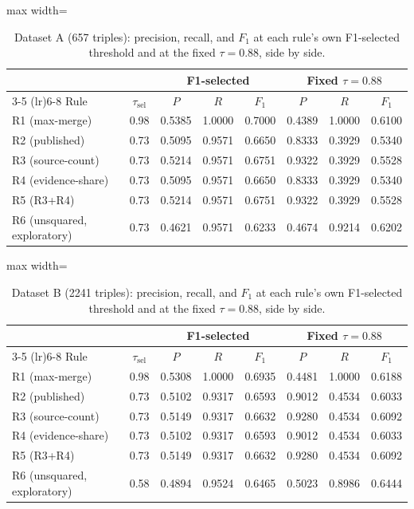 \documentclass[11pt]{article}
\begin{document}
\begin{table}[htbp]
\centering
\caption{Dataset A (657 triples): precision, recall, and $F_1$ at each
rule's own F1-selected threshold and at the fixed $\tau=0.88$, side by
side.}
\label{tab:dec026-a-metrics}
\begin{adjustbox}{max width=\textwidth}
\begin{tabular}{@{}lc ccc ccc@{}}
\toprule
& & \multicolumn{3}{c}{F1-selected} & \multicolumn{3}{c}{Fixed $\tau=0.88$} \\
\cmidrule(lr){3-5} \cmidrule(lr){6-8}
Rule & $\tau_{\text{sel}}$ & $P$ & $R$ & $F_1$ & $P$ & $R$ & $F_1$ \\
\midrule
R1 (max-merge) & 0.98 & 0.5385 & 1.0000 & 0.7000 & 0.4389 & 1.0000 & 0.6100 \\
R2 (published) & 0.73 & 0.5095 & 0.9571 & 0.6650 & 0.8333 & 0.3929 & 0.5340 \\
R3 (source-count) & 0.73 & 0.5214 & 0.9571 & 0.6751 & 0.9322 & 0.3929 & 0.5528 \\
R4 (evidence-share) & 0.73 & 0.5095 & 0.9571 & 0.6650 & 0.8333 & 0.3929 & 0.5340 \\
R5 (R3+R4) & 0.73 & 0.5214 & 0.9571 & 0.6751 & 0.9322 & 0.3929 & 0.5528 \\
R6 (unsquared, exploratory) & 0.73 & 0.4621 & 0.9571 & 0.6233 & 0.4674 & 0.9214 & 0.6202 \\
\bottomrule
\end{tabular}
\end{adjustbox}
\end{table}

\begin{table}[htbp]
\centering
\caption{Dataset B (2241 triples): precision, recall, and $F_1$ at each
rule's own F1-selected threshold and at the fixed $\tau=0.88$, side by
side.}
\label{tab:dec026-b-metrics}
\begin{adjustbox}{max width=\textwidth}
\begin{tabular}{@{}lc ccc ccc@{}}
\toprule
& & \multicolumn{3}{c}{F1-selected} & \multicolumn{3}{c}{Fixed $\tau=0.88$} \\
\cmidrule(lr){3-5} \cmidrule(lr){6-8}
Rule & $\tau_{\text{sel}}$ & $P$ & $R$ & $F_1$ & $P$ & $R$ & $F_1$ \\
\midrule
R1 (max-merge) & 0.98 & 0.5308 & 1.0000 & 0.6935 & 0.4481 & 1.0000 & 0.6188 \\
R2 (published) & 0.73 & 0.5102 & 0.9317 & 0.6593 & 0.9012 & 0.4534 & 0.6033 \\
R3 (source-count) & 0.73 & 0.5149 & 0.9317 & 0.6632 & 0.9280 & 0.4534 & 0.6092 \\
R4 (evidence-share) & 0.73 & 0.5102 & 0.9317 & 0.6593 & 0.9012 & 0.4534 & 0.6033 \\
R5 (R3+R4) & 0.73 & 0.5149 & 0.9317 & 0.6632 & 0.9280 & 0.4534 & 0.6092 \\
R6 (unsquared, exploratory) & 0.58 & 0.4894 & 0.9524 & 0.6465 & 0.5023 & 0.8986 & 0.6444 \\
\bottomrule
\end{tabular}
\end{adjustbox}
\end{table}
\end{document}
